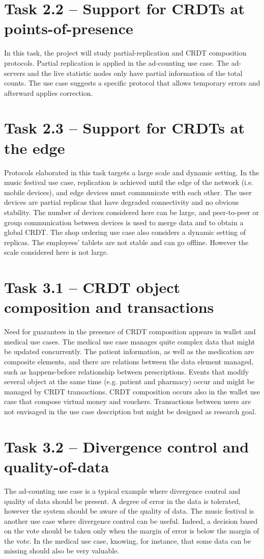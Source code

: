 \documentclass[11pt,a4paper]{report}
\begin{document}
\section{Task 2.2 --   Support for CRDTs at points-of-presence}
In this task, the project will study partial-replication and CRDT composition protocols. Partial replication is applied in the ad-counting use case. The ad-servers and the live statistic nodes only have partial information of the total counts. The use case suggests a specific protocol that allows temporary errors and afterward applies correction.
\section{Task 2.3 --   Support for CRDTs at the edge}
Protocols elaborated in this task targets a large scale and dynamic setting. In the music festival use case, replication is achieved until the edge of the network (i.e. mobile devices), and edge devices must communicate with each other. The user devices are partial replicas that have degraded connectivity and no obvious stability. The number of devices considered here can be large, and peer-to-peer or group communication between devices is used to merge data and to obtain a global CRDT.
The shop ordering use case also considers a dynamic setting of replicas. The employees' tablets are not stable and can go offline. However the scale considered here is not large. 
\section{Task 3.1  --  CRDT object composition and transactions}
Need for guarantees in the presence of CRDT composition appears in wallet and medical use cases. The medical use case manages quite complex data that might be updated concurrently. The patient information, as well as the medication are composite elements, and there are relations between the data element managed, such as happens-before relationship between prescriptions. Events that modify several object at the same time (e.g. patient and pharmacy) occur and might be managed by CRDT transactions.
CRDT composition occurs also in the wallet use case that compose virtual money and vouchers. Transactions between users are not envisaged in the use case description but might be designed as research goal.   
\section{Task 3.2  --  Divergence control and quality-of-data}
The ad-counting use case is a typical example where divergence control and quality of data should be present. A degree of error in the data is tolerated, however the system should be aware of the quality of data. 
The music festival is another use case where divergence control can be useful. Indeed, a decision based on the vote should be taken only when the margin of error is below the margin of the vote. 
In the medical use case, knowing, for instance, that some data can be missing should also be very valuable.
\end{document}
